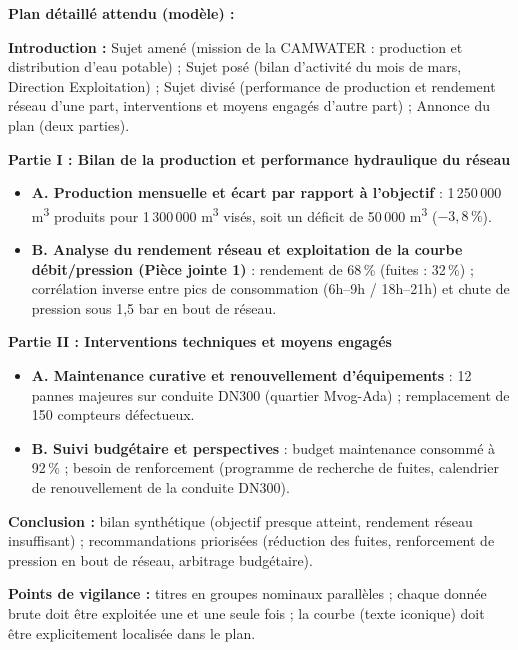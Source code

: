 \documentclass[11pt]{article}
\begin{document}
\begin{corrige}
\textbf{Plan détaillé attendu (modèle) :}

\textbf{Introduction :} Sujet amené (mission de la CAMWATER : production et distribution d'eau potable) ; Sujet posé (bilan d'activité du mois de mars, Direction Exploitation) ; Sujet divisé (performance de production et rendement réseau d'une part, interventions et moyens engagés d'autre part) ; Annonce du plan (deux parties).

\textbf{Partie I : Bilan de la production et performance hydraulique du réseau}
\begin{itemize}
    \item \textbf{A. Production mensuelle et écart par rapport à l'objectif} : 1\,250\,000 m\textsuperscript{3} produits pour 1\,300\,000 m\textsuperscript{3} visés, soit un déficit de 50\,000 m\textsuperscript{3} ($-3,8\,\%$).
    \item \textbf{B. Analyse du rendement réseau et exploitation de la courbe débit/pression (Pièce jointe 1)} : rendement de 68\,\% (fuites : 32\,\%) ; corrélation inverse entre pics de consommation (6h--9h / 18h--21h) et chute de pression sous 1,5 bar en bout de réseau.
\end{itemize}

\textbf{Partie II : Interventions techniques et moyens engagés}
\begin{itemize}
    \item \textbf{A. Maintenance curative et renouvellement d'équipements} : 12 pannes majeures sur conduite DN300 (quartier Mvog-Ada) ; remplacement de 150 compteurs défectueux.
    \item \textbf{B. Suivi budgétaire et perspectives} : budget maintenance consommé à 92\,\% ; besoin de renforcement (programme de recherche de fuites, calendrier de renouvellement de la conduite DN300).
\end{itemize}

\textbf{Conclusion :} bilan synthétique (objectif presque atteint, rendement réseau insuffisant) ; recommandations priorisées (réduction des fuites, renforcement de pression en bout de réseau, arbitrage budgétaire).

\textbf{Points de vigilance :} titres en groupes nominaux parallèles ; chaque donnée brute doit être exploitée une et une seule fois ; la courbe (texte iconique) doit être explicitement localisée dans le plan.
\end{corrige}
\end{document}

